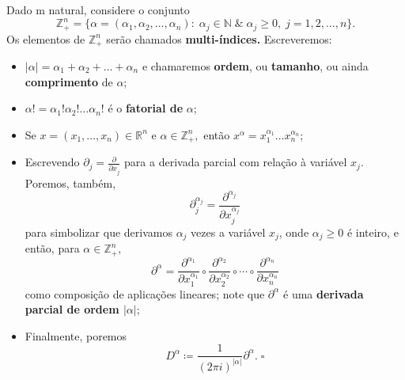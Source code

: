 \documentclass[../distribution_theory_notes.tex]{subfiles}
\begin{document}
\begin{def*}
	Dado m natural, considere o conjunto
	\[
		\mathbb{Z}_{+}^{n}=\{\alpha = (\alpha_1, \alpha_2, \dotsc , \alpha_{n}):\; \alpha_{j}\in \mathbb{N}\;\&\; \alpha_{j}\geq 0,\; j=1,2,\dotsc ,n\}.
	\]
	Os elementos de \(\mathbb{Z}_{+}^{n}\) serão chamados \textbf{multi-índices.} Escreveremos:
	\begin{itemize}
		\item \(|\alpha |=\alpha_1+\alpha_2+\dotsc +\alpha_{n}\) e chamaremos \textbf{ordem}, ou \textbf{tamanho}, ou ainda \textbf{comprimento} de \(\alpha\);
		\item \(\alpha! = \alpha_1!\alpha_2!\dotsc \alpha_{n}!\) é o \textbf{fatorial de} \(\alpha \);
		\item Se \(x=(x_1,\dotsc ,x_{n})\in \mathbb{R}^{n}\) e \(\alpha\in \mathbb{Z}_{+}^{n},\) então \(x^{\alpha }=x_{1}^{\alpha_1}\dotsc x_{n}^{\alpha_{n}}\);
		\item Escrevendo \(\partial_{j}=\frac{\partial^{}}{\partial x_{j}^{}}\) para a derivada parcial com relação à variável \(x_{j}\). Poremos, também,
		      \[
			      \partial_{j}^{\alpha_{j}}=\frac{\partial^{\alpha_{j}}}{\partial x_{j}^{\alpha_{j}}}
		      \]
		      para simbolizar que derivamos \(\alpha_{j}\) vezes a variável \(x_{j}\), onde \(\alpha_{j}\geq 0\) é inteiro, e então, para \(\alpha \in \mathbb{Z}_{+}^{n},\)
		      \[
			      \partial^{\alpha } = \frac{\partial^{\alpha_1}}{\partial x_1^{\alpha_1}}\circ \frac{\partial^{\alpha_2}}{\partial x_2^{\alpha_2}}\circ\cdots\circ \frac{\partial^{\alpha_n}}{\partial x_n^{\alpha_n}}
		      \]
		      como composição de aplicações lineares; note que \(\partial^{\alpha }\) é uma \textbf{derivada parcial de ordem \(|\alpha |\)};
		\item Finalmente, poremos
		      \[
			      D^{\alpha }\coloneqq \frac{1}{(2\pi i)^{|\alpha |}}\partial^{\alpha }.\;\square
		      \]
	\end{itemize}
\end{def*}
\end{document}
